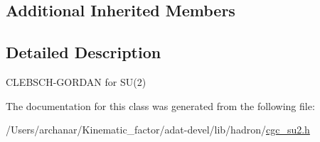 \subsection*{Additional Inherited Members}


\subsection{Detailed Description}
C\+L\+E\+B\+S\+C\+H-\/\+G\+O\+R\+D\+AN for S\+U(2) 

The documentation for this class was generated from the following file\+:\begin{DoxyCompactItemize}
\item 
/\+Users/archanar/\+Kinematic\+\_\+factor/adat-\/devel/lib/hadron/\mbox{\hyperlink{adat-devel_2lib_2hadron_2cgc__su2_8h}{cgc\+\_\+su2.\+h}}\end{DoxyCompactItemize}
